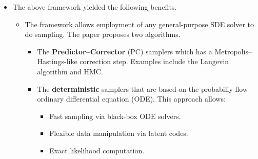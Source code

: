 \documentclass[10pt]{article}
\begin{document}
\begin{itemize}
  \begin{comment}
  \item I think the main goal of the paper is to show the above framework is really powerful, so the authors went to great lengths to show that DDPM and SMLD can be talked about using the framework's language.
  
  \begin{itemize}
    \item The author derived SDEs for both DDPM and SMLD.
    \begin{itemize}
      \item The derivation for the SMLD's SDE was okay.
      \item The derivation of the DDPM's SDE was not at all rigourous. The derived SDE is similar in feeling but does not exactly match what the DDPM does.
    \end{itemize}

    \item They then recasted DDPM's sampling algorithm (which they called ``ancestral sampling'') as simply solving the DDPM's reverse-time SDE with a simple time discritization strategy.
    \begin{itemize}
      \item Because the DDPM's SDE does not quite actually agree mathematically with the DDPM, this was unnatural.
    \end{itemize}

    \item To show the power of the framework further, they also derived ancestral sampling for SMLD.
  \end{itemize}
  \end{comment}

  \item The above framework yielded the following benefits.
  \begin{itemize}
    \item The framework allows employment of any general-purpose SDE solver to do sampling. The paper proposes two algorithms.
    \begin{itemize}
      \item The {\bf Predictor--Corrector} (PC) samplers which has a Metropolis--Hastings-like correction step. Examples include the Langevin algorithm and HMC.
      
      \item The {\bf deterministic} samplers that are based on the probabiliy flow ordinary differential equation (ODE). This approach allows:
      \begin{itemize}
        \item Fast sampling via black-box ODE solvers.
        \item Flexible data manipulation via latent codes.
        \item Exact likelihood computation.
      \end{itemize}


\end{itemize}
\end{itemize}
\end{itemize}
\end{document}
